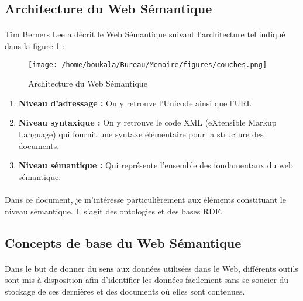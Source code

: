 \documentclass[12pt, a4paper, oneside]{book}
\begin{document}
\subsection{Architecture du Web Sémantique}
\paragraph{}
Tim Berners Lee a décrit le Web Sémantique suivant l'architecture tel indiqué dans la figure \ref{couches} :  

\begin{figure}[h!]
\begin{center}
\texttt{[image: /home/boukala/Bureau/Memoire/figures/couches.png]}
\caption{Architecture du Web Sémantique}
\label{couches}
\end{center}
\end{figure}


\begin{enumerate}

\item \textbf{Niveau d'adressage : } On y retrouve l'Unicode ainsi que l'URI.

\item \textbf{Niveau syntaxique : } On y retrouve le code XML (eXtensible Markup Language) qui fournit une syntaxe élémentaire pour la structure des documents.

\item \textbf{Niveau sémantique : } Qui représente l'ensemble des fondamentaux du web sémantique.

\end{enumerate}

\paragraph{}
Dans ce document, je m'intéresse particulièrement aux éléments constituant le niveau sémantique. Il s'agit des ontologies et des bases RDF.


\subsection{Concepts de base du Web Sémantique}
\paragraph{}
Dans le but de donner du sens aux données utilisées dans le Web, différents outils sont mis à disposition afin d'identifier les données facilement sans se soucier du stockage de ces dernières et des documents où elles sont contenues.
\end{document}
